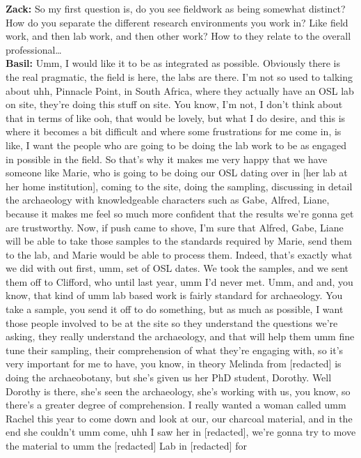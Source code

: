 \documentclass[
  canadian,
]{article}
\begin{document}
\textbf{Zack:} So my first question is, do you see fieldwork as being
somewhat distinct? How do you separate the different research
environments you work in? Like field work, and then lab work, and then
other work? How to they relate to the overall professional\ldots{}\\
\textbf{Basil:} Umm, I would like it to be as integrated as possible.
Obviously there is the real pragmatic, the field is here, the labs are
there. I'm not so used to talking about uhh, Pinnacle Point, in South
Africa, where they actually have an OSL lab on site, they're doing this
stuff on site. You know, I'm not, I don't think about that in terms of
like ooh, that would be lovely, but what I do desire, and this is where
it becomes a bit difficult and where some frustrations for me come in,
is like, I want the people who are going to be doing the lab work to be
as engaged in possible in the field. So that's why it makes me very
happy that we have someone like Marie, who is going to be doing our OSL
dating over in {[}her lab at her home institution{]}, coming to the
site, doing the sampling, discussing in detail the archaeology with
knowledgeable characters such as Gabe, Alfred, Liane, because it makes
me feel so much more confident that the results we're gonna get are
trustworthy. Now, if push came to shove, I'm sure that Alfred, Gabe,
Liane will be able to take those samples to the standards required by
Marie, send them to the lab, and Marie would be able to process them.
Indeed, that's exactly what we did with out first, umm, set of OSL
dates. We took the samples, and we sent them off to Clifford, who until
last year, umm I'd never met. Umm, and and, you know, that kind of umm
lab based work is fairly standard for archaeology. You take a sample,
you send it off to do something, but as much as possible, I want those
people involved to be at the site so they understand the questions we're
asking, they really understand the archaeology, and that will help them
umm fine tune their sampling, their comprehension of what they're
engaging with, so it's very important for me to have, you know, in
theory Melinda from {[}redacted{]} is doing the archaeobotany, but she's
given us her PhD student, Dorothy. Well Dorothy is there, she's seen the
archaeology, she's working with us, you know, so there's a greater
degree of comprehension. I really wanted a woman called umm Rachel this
year to come down and look at our, our charcoal material, and in the end
she couldn't umm come, uhh I saw her in {[}redacted{]}, we're gonna try
to move the material to umm the {[}redacted{]} Lab in {[}redacted{]} for
\end{document}
